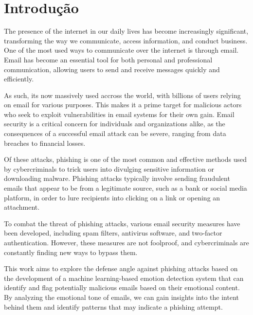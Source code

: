 \chapter{Introdução}%
\label{chapter:introduction}

The presence of the internet in our daily lives has become increasingly significant, transforming the way we communicate, access information, and conduct business. One of the most used ways to communicate over the internet is through email. Email has become an essential tool for both personal and professional communication, allowing users to send and receive messages quickly and efficiently.

As such, its now massively used accross the world, with billions of users relying on email for various purposes. This makes it a prime target for malicious actors who seek to exploit vulnerabilities in email systems for their own gain. Email security is a critical concern for individuals and organizations alike, as the consequences of a successful email attack can be severe, ranging from data breaches to financial losses.

Of these attacks, phishing is one of the most common and effective methods used by cybercriminals to trick users into divulging sensitive information or downloading malware. Phishing attacks typically involve sending fraudulent emails that appear to be from a legitimate source, such as a bank or social media platform, in order to lure recipients into clicking on a link or opening an attachment.

To combat the threat of phishing attacks, various email security measures have been developed, including spam filters, antivirus software, and two-factor authentication. However, these measures are not foolproof, and cybercriminals are constantly finding new ways to bypass them.

This work aims to explore the defense angle against phishing attacks based on the development of a machine learning-based emotion detection system that can identify and flag potentially malicious emails based on their emotional content. By analyzing the emotional tone of emails, we can gain insights into the intent behind them and identify patterns that may indicate a phishing attempt.